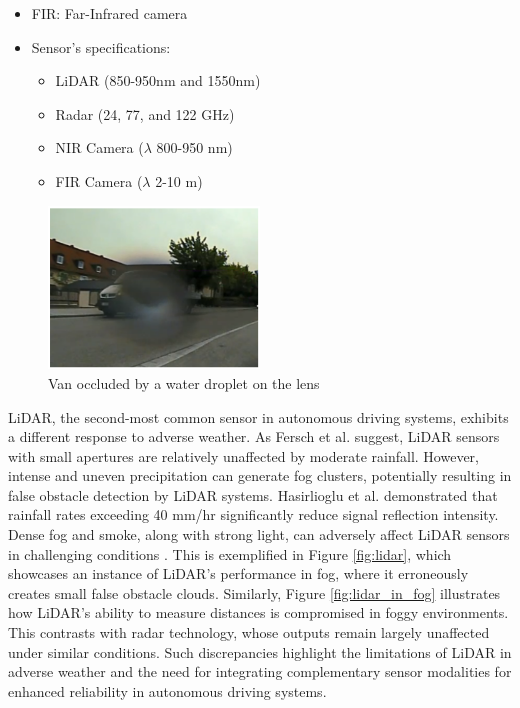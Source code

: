 \documentclass[report.tex]{subfiles}
\begin{document}
\begin{table}
\begin{tablenotes}
\begin{itemize}
                \item FIR: Far-Infrared camera
                \item Sensor's specifications:
                \begin{itemize}
                    \item LiDAR (850-950nm and 1550nm)
                    \item Radar (24, 77, and 122 GHz)
                    \item NIR Camera ($\lambda$ 800-950 nm)
                    \item FIR Camera ($\lambda$ 2-10 \textmu m)
                \end{itemize}
            \end{itemize}
        \end{tablenotes}
    \end{table}

    
    \begin{figure}[h]
        \centering
        \includegraphics[width=0.5\textwidth]{images/rain_droplet.png}
        \caption{Van occluded by a water droplet on the lens \cite{Nobis2020May}}
        \label{fig:camera_in_rain}
    \end{figure}
    
    LiDAR, the second-most common sensor in autonomous driving systems, exhibits a different response to adverse weather. As Fersch et al. \cite{fersch2016influence} suggest, LiDAR sensors with small apertures are relatively unaffected by moderate rainfall. However, intense and uneven precipitation can generate fog clusters, potentially resulting in false obstacle detection by LiDAR systems. Hasirlioglu et al. \cite{hasirlioglu2016modeling} demonstrated that rainfall rates exceeding 40 mm/hr significantly reduce signal reflection intensity. Dense fog and smoke, along with strong light, can adversely affect LiDAR sensors in challenging conditions \cite{zhang2023perception, acarballo2020libre}. This is exemplified in Figure \ref{fig:lidar}, which showcases an instance of LiDAR's performance in fog, where it erroneously creates small false obstacle clouds. Similarly, Figure \ref{fig:lidar_in_fog} illustrates how LiDAR's ability to measure distances is compromised in foggy environments. This contrasts with radar technology, whose outputs remain largely unaffected under similar conditions. Such discrepancies highlight the limitations of LiDAR in adverse weather and the need for integrating complementary sensor modalities for enhanced reliability in autonomous driving systems.
\end{document}
